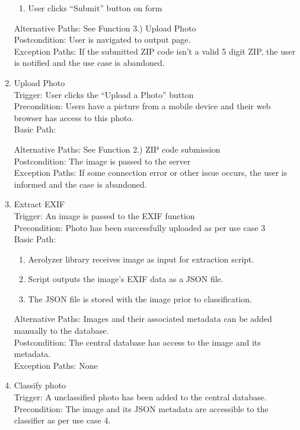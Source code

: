 \documentclass[journal,10pt,draftclsnofoot,onecolumn]{IEEEtran}
\begin{document}
\begin{singlespace}
\begin{enumerate}
\begin{enumerate}
\item User clicks “Submit” button on form
\end{enumerate}
Alternative Paths: See Function 3.) Upload Photo\\
Postcondition: User is navigated to output page.\\
Exception Paths: If the submitted ZIP code isn't a valid 5 digit ZIP, the user is notified and the use case is abandoned.
\\
\item Upload Photo\\
Trigger: User clicks the “Upload a Photo” button\\
Precondition: Users have a picture from a mobile device and their web browser has access to this photo.\\
Basic Path:\begin{enumerate}
\end{enumerate}
Alternative Paths: See Function 2.) ZIP code submission\\
Postcondition: The image is passed to the server\\
Exception Paths: If some connection error or other issue occurs, the user is informed and the case is abandoned.
\\
\item Extract EXIF\\
Trigger: An image is passed to the EXIF function\\
Precondition: Photo has been successfully uploaded as per use case 3\\
Basic Path:\begin{enumerate} 
\item Aerolyzer library receives image as input for extraction script.
\item Script outputs the image's EXIF data as a JSON file.
\item The JSON file is stored with the image prior to classification.
\end{enumerate}
Alternative Paths: Images and their associated metadata can be added manually to the database.\\
Postcondition: The central database has access to the image and its metadata.\\
Exception Paths: None
\\
\item Classify photo\\
Trigger: A unclassified photo has been added to the central database.\\
Precondition: The image and its JSON metadata are accessible to the classifier as per use case 4.\\

\end{enumerate}
\end{singlespace}
\end{document}
